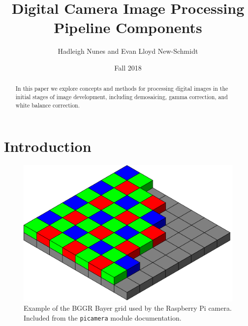 \documentclass{article}\twocolumn
\title{Digital Camera Image Processing Pipeline Components}
\author{Hadleigh Nunes and Evan Lloyd New-Schmidt}
\date{Fall 2018}
\begin{document}
\maketitle


\begin{abstract}
    In this paper we explore concepts and methods for processing digital images in the initial stages of image development, including demosaicing, gamma correction, and white balance correction.
\end{abstract}

\section{Introduction}



\begin{figure}[!h]
    \centering
    \includegraphics[width=\columnwidth]{bggr_bayer_pattern}
    \caption{Example of the BGGR Bayer grid used by the Raspberry Pi camera. Included from the \lstinline{picamera} module documentation\cite{picameradocs}.}
    \label{fig:bayer_pattern}
\end{figure}


\end{document}

